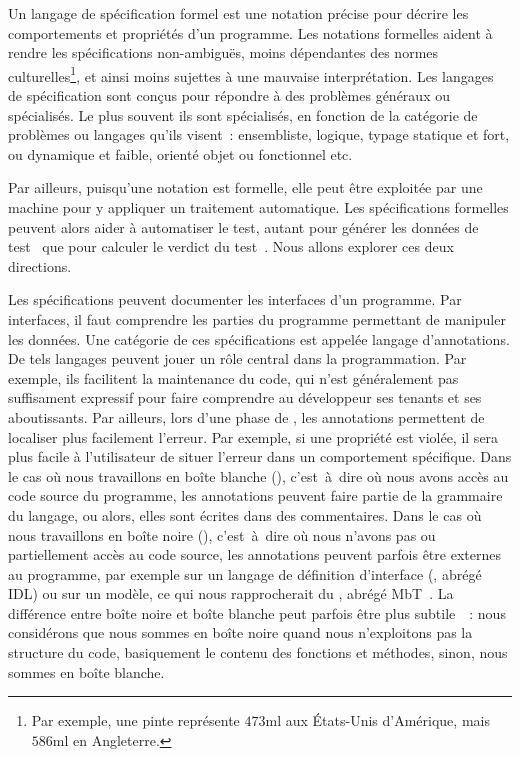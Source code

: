 Un {\strong langage de spécification} formel est une notation précise pour
décrire les comportements et propriétés d'un programme. Les {\strong notations
formelles} aident à rendre les spécifications non-ambiguës, moins dépendantes
des normes culturelles\footnote{Par exemple, une pinte représente $473$ml aux
États-Unis d'Amérique, mais $586$ml en Angleterre.}, et ainsi moins sujettes à
une mauvaise interprétation. Les langages de spécification sont conçus pour
répondre à des problèmes généraux ou spécialisés. Le plus souvent ils sont
spécialisés, en fonction de la catégorie de problèmes ou langages qu'ils
visent~: ensembliste, logique, typage statique et fort, ou dynamique et faible,
orienté objet ou fonctionnel etc.

Par ailleurs, puisqu'une notation est formelle, elle peut être exploitée par une
machine pour y appliquer un traitement automatique. Les spécifications formelles
peuvent alors aider à {\strong automatiser le test}, autant pour générer les
données de test~ que pour
calculer le verdict du test~. Nous allons explorer ces deux
directions.

Les spécifications peuvent documenter les {\strong interfaces} d'un programme.
Par interfaces, il faut comprendre les parties du programme permettant de
manipuler les données. Une catégorie de ces spécifications est appelée {\strong
langage d'annotations}. De tels langages peuvent jouer un rôle central dans la
programmation. Par exemple, ils facilitent la maintenance du code, qui n'est
généralement pas suffisament expressif pour faire comprendre au développeur ses
tenants et ses aboutissants. Par ailleurs, lors d'une phase de
, les annotations permettent de localiser plus facilement
l'erreur. Par exemple, si une propriété est violée, il sera plus facile à
l'utilisateur de situer l'erreur dans un comportement spécifique. Dans le cas où
nous travaillons en {\strong boîte blanche} (),
c'est~à~dire où nous avons accès au code source du programme, les annotations
peuvent faire partie de la grammaire du langage, ou alors, elles sont écrites
dans des commentaires. Dans le cas où nous travaillons en {\strong boîte noire}
(), c'est~à~dire où nous n'avons pas ou partiellement accès
au code source, les annotations peuvent parfois être externes au programme, par
exemple sur un langage de définition d'interface (, abrégé IDL) ou sur un modèle, ce qui nous rapprocherait du
, abrégé MbT~. La différence
entre boîte noire et boîte blanche peut parfois être plus
subtile~~: nous considérons que nous sommes en boîte noire quand
nous n'exploitons pas la structure du code, basiquement le contenu des fonctions
et méthodes, sinon, nous sommes en boîte blanche.

